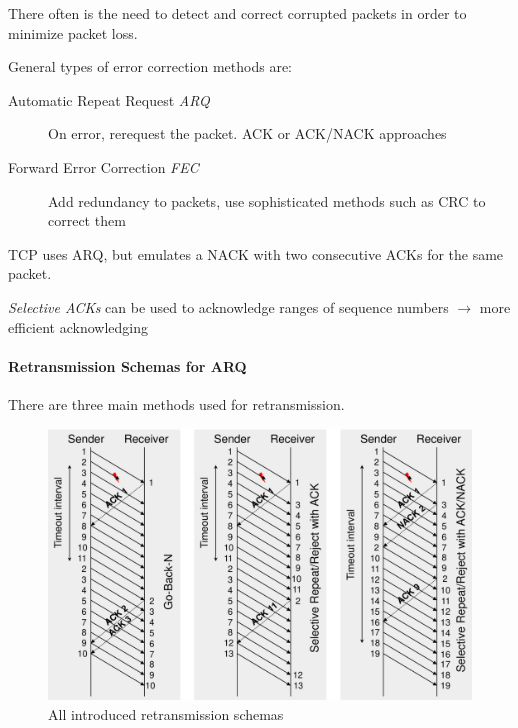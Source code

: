 \documentclass[english]{panikzettel}
\begin{document}
	There often is the need to detect and correct corrupted packets in order to minimize packet loss.

	General types of error correction methods are:
	\begin{description}
		\item[Automatic Repeat Request \textit{ARQ}] On error, rerequest the packet. ACK or ACK/NACK approaches
		\item[Forward Error Correction \textit{FEC}] Add redundancy to packets, use sophisticated methods such as CRC to correct them
	\end{description}

	TCP uses ARQ, but emulates a NACK with two consecutive ACKs for the same packet.

	\textit{Selective ACKs} can be used to acknowledge ranges of sequence numbers \( \rightarrow \) more efficient acknowledging

	\paragraph{Retransmission Schemas for ARQ}
	\label{pgf-retransmission-schemas-for-arq}
		
	There are three main methods used for retransmission.

	\begin{figure}[H]
		\centering
		\includegraphics[width=\textwidth]{img/2-retransmission-schemas.png}
		\caption{All introduced retransmission schemas}
		\label{img-2-retransmission-schemas}
	\end{figure}
\end{document}
